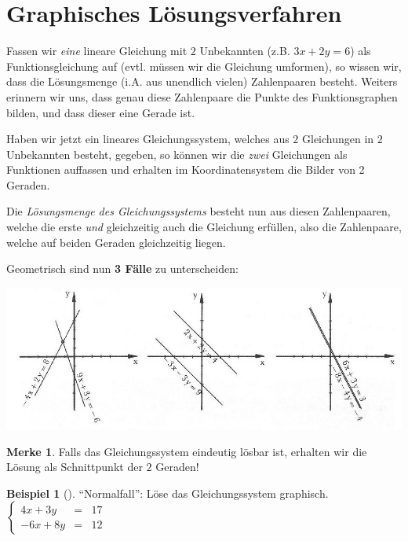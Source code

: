 \documentclass[a4paper, twoside, parskip, 10pt, smallheadings]{scrbook}
\theoremstyle{plain}
\theoremstyle{definition}
\newtheorem{Bsp}{Beispiel}%
\newtheorem*{Mer}{Merke}
\newenvironment{fshaded}{%
\def\FrameCommand{\fcolorbox{framecolor}{shadecolor}}%
\MakeFramed {\FrameRestore}}%
{\endMakeFramed}
\newenvironment{fbsp}[1][]{\definecolor{shadecolor}{rgb}{.57,1,.28}%
\definecolor{framecolor}{rgb}{.25, .63, 0}%
\begin{fshaded}\begin{Bsp}[#1]}{\end{Bsp}\end{fshaded}}
\newcommand{\bb}{\begin{fbsp}}
\newcommand{\eb}{\end{fbsp}}
\newcommand{\bme}{\begin{Mer}}
\newcommand{\eme}{\end{Mer}}
\begin{document}
\section{Graphisches L\"{o}sungsverfahren}


Fassen wir \textit{eine} lineare Gleichung mit $2$ Unbekannten (z.B. $3x + 2y = 6$) als Funktionsgleichung
auf (evtl. m\"{u}ssen wir die Gleichung umformen), so wissen wir, dass die L\"{o}sungsmenge (i.A. aus unendlich
vielen) Zahlenpaaren besteht. Weiters erinnern wir uns, dass genau diese Zahlenpaare die Punkte des
Funktionsgraphen bilden, und dass dieser eine Gerade ist.


Haben wir jetzt ein lineares Gleichungssystem, welches aus $2$ Gleichungen in $2$ Unbekannten besteht,
gegeben, so k\"{o}nnen wir die \textit{zwei} Gleichungen als Funktionen auffassen und erhalten im
Koordinatensystem die Bilder von 2 Geraden.


Die \textit{L\"{o}sungsmenge des Gleichungssystems} besteht nun aus diesen Zahlenpaaren, welche die erste {\it
und} gleichzeitig auch die Gleichung erf\"{u}llen, also die Zahlenpaare, welche auf beiden Geraden gleichzeitig
liegen.

Geometrisch sind nun {\bf 3 F\"{a}lle} zu unterscheiden:

\includegraphics[width=\textwidth]{2te/linearegleichungssysteme/bilder/3arten.jpg}

\bme Falls das Gleichungssystem eindeutig l\"{o}sbar ist, erhalten wir die L\"{o}sung als Schnittpunkt der $2$
Geraden! \eme

\bb "`Normalfall"': Löse das Gleichungssystem graphisch.  $ \left\{ \begin{array}{rcl} 4x+3y & = & 17 \\
                                               -6x+8y & = & 12
                                       \end{array} \right.        $ \eb
\end{document}
